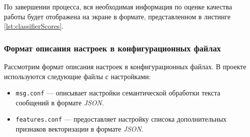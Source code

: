         По завершении процесса, вся необходимая информация по оценке качества
        работы будет отображена на экране в формате, представленном в листинге
        \ref{lst:classifierScores}.

    \subsubsection{Формат описания настроек в конфигурационных файлах}

    Рассмотрим формат описания настроек в конфигурационных файлах.
    В проекте используются следующие файлы с настройками:

    \begin{itemize}
        \item {\tt msg.conf} --- описывает настройки семантической обработки текста
            сообщений в формате {\it JSON}.
        \item {\tt features.conf} --- предоставляет настройку списока
            дополнительных признаков векторизации в формате {\it JSON}.
    \end{itemize}

